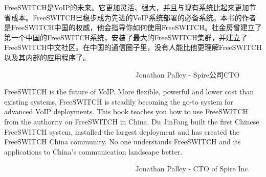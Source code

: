 \documentclass[$if(fontsize)$$fontsize$,$endif$$if(lang)$$lang$,$endif$CJKutf8,twoside,openright]{$documentclass$}
\begin{document}
\begin{CJK}{UTF8}{gbsn}
FreeSWITCH是VoIP的未来。它更加灵活、强大，并且与现有系统比起来更加节省成本。FreeSWITCH已稳步成为先进的VoIP系统部署的必备系统。本书的作者是FreeSWITCH中国的权威，他会指导你如何使用FreeSWITCH。杜金房曾建立了第一个中国的FreeSWITCH系统，安装了最大的FreeSWITCH集群，并建立了FreeSWITCH中文社区。在中国的通信圈子里，没有人能比他更理解FreeSWITCH以及其内部的应用程序了。

　　　　　　　　　　　　　　　　　　 Jonathan Palley - Spire公司CTO

FreeSWITCH is the future of VoIP. More flexible, powerful and lower cost than existing systems, FreeSWITCH is steadily becoming the go-to system for advanced VoIP deployments.  This book teaches you how to use FreeSWITCH from the authority on FreeSWITCH in China.  Du JinFang built the first Chinese FreeSWITCH system, installed the largest deployment and has created the FreeSWITCH China community.  No one understands FreeSWITCH and its applications to China's communication landscape better.

　　　　　　　　　　　　　　　　　　 Jonathan Palley - CTO of Spire Inc.


\newpage

\end{CJK}
\end{document}
